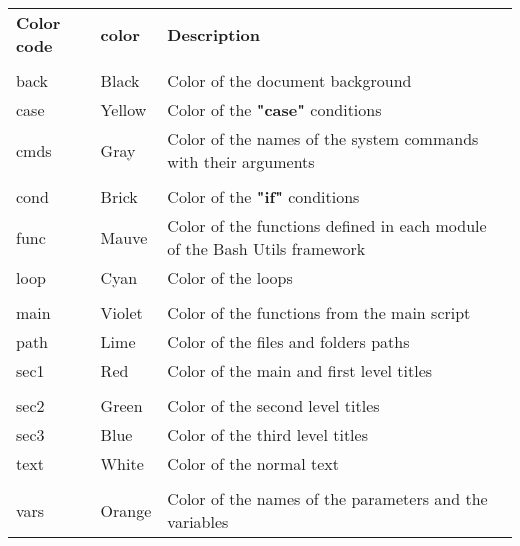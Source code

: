 \documentclass[a4paper,10pt]{article}
\begin{document}
    \begin{justify}
        \begin{tabular}{lll}
            \textbf{Color code} & \textbf{color}        & \textbf{Description}\\\\

            \color{text}back    & \color{text}Black     & \color{text}Color of the document background\\
            \color{case}case    & \color{case}Yellow    & \color{case}Color of the \textbf{"case"} conditions\\
            \color{cmds}cmds    & \color{cmds}Gray      & \color{cmds}Color of the names of the system commands with their arguments\\\\

            \color{cond}cond    & \color{cond}Brick     & \color{cond}Color of the \textbf{"if"} conditions\\
            \color{func}func    & \color{func}Mauve     & \color{func}Color of the functions defined in each module of the Bash Utils framework\\
            \color{loop}loop    & \color{loop}Cyan      & \color{loop}Color of the loops\\\\

            \color{main}main    & \color{main}Violet    & \color{main}Color of the functions from the main script\\
            \color{path}path    & \color{path}Lime      & \color{path}Color of the files and folders paths\\
            \color{sec1}sec1    & \color{sec1}Red       & \color{sec1}Color of the main and first level titles\\\\

            \color{sec2}sec2    & \color{sec2}Green     & \color{sec2}Color of the second level titles\\
            \color{sec3}sec3    & \color{sec3}Blue      & \color{sec3}Color of the third level titles\\
            \color{text}text    & \color{text}White     & \color{text}Color of the normal text\\\\

            \color{vars}vars    & \color{vars}Orange    & \color{vars}Color of the names of the parameters and the variables\\
        \end{tabular}
    \end{justify}
\end{document}
